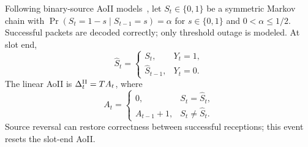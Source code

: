 Following binary-source AoII models~\cite{maatouk2020aoii,chen2021imperfect}, let $S_t\in\{0,1\}$ be a symmetric Markov chain with $\Pr(S_t=1-s\mid S_{t-1}=s)=\alpha$ for $s\in\{0,1\}$ and $0<\alpha\le1/2$. Successful packets are decoded correctly; only threshold outage is modeled. At slot end,
\begin{equation}
 \widehat S_t=\begin{cases}
 S_t,&Y_t=1,\\
 \widehat S_{t-1},&Y_t=0.
 \end{cases}
 \label{eq:estimate}
\end{equation}
The linear AoII is $\Delta_t^{\rm II}=TA_t$, where
\begin{equation}
 A_t=\begin{cases}
 0,&S_t=\widehat S_t,\\
 A_{t-1}+1,&S_t\ne\widehat S_t.
 \end{cases}
 \label{eq:aoii}
\end{equation}
Source reversal can restore correctness between successful receptions; this event resets the slot-end AoII.
